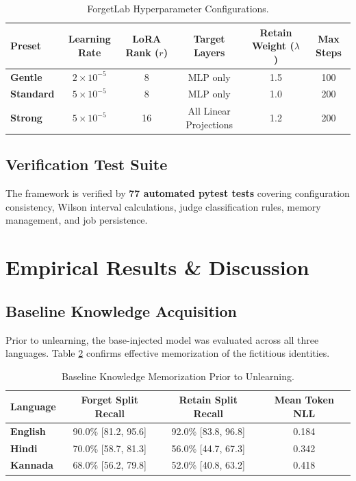 \documentclass[11pt,a4paper]{article}
\begin{document}
\begin{table}[htbp]
\centering
\small
\caption{ForgetLab Hyperparameter Configurations.}
\label{tab:presets_table}
\begin{tabular}{lccccc}
\toprule
\textbf{Preset} & \textbf{Learning Rate} & \textbf{LoRA Rank ($r$)} & \textbf{Target Layers} & \textbf{Retain Weight ($\lambda$)} & \textbf{Max Steps} \\
\midrule
\textbf{Gentle} & $2 \times 10^{-5}$ & 8 & MLP only & 1.5 & 100 \\
\textbf{Standard} & $5 \times 10^{-5}$ & 8 & MLP only & 1.0 & 200 \\
\textbf{Strong} & $5 \times 10^{-5}$ & 16 & All Linear Projections & 1.2 & 200 \\
\bottomrule
\end{tabular}
\end{table}

\subsection{Verification Test Suite}
The framework is verified by \textbf{77 automated pytest tests} covering configuration consistency, Wilson interval calculations, judge classification rules, memory management, and job persistence.

\section{Empirical Results \& Discussion}
\label{sec:results}

\subsection{Baseline Knowledge Acquisition}
Prior to unlearning, the base-injected model was evaluated across all three languages. Table \ref{tab:baseline_results} confirms effective memorization of the fictitious identities.

\begin{table}[htbp]
\centering
\small
\caption{Baseline Knowledge Memorization Prior to Unlearning.}
\label{tab:baseline_results}
\begin{tabular}{lccc}
\toprule
\textbf{Language} & \textbf{Forget Split Recall} & \textbf{Retain Split Recall} & \textbf{Mean Token NLL} \\
\midrule
\textbf{English} & 90.0\% [81.2, 95.6] & 92.0\% [83.8, 96.8] & 0.184 \\
\textbf{Hindi} & 70.0\% [58.7, 81.3] & 56.0\% [44.7, 67.3] & 0.342 \\
\textbf{Kannada} & 68.0\% [56.2, 79.8] & 52.0\% [40.8, 63.2] & 0.418 \\
\bottomrule
\end{tabular}
\end{table}
\end{document}
